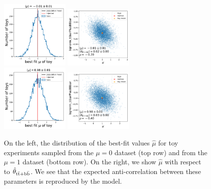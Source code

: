 \begin{figure}
\setlength{\floatsep}{1pt}
\begin{centering}
\includegraphics[width=0.30\textwidth]{figures/tth/mu_sig_group_sldl_0_0.pdf}
\includegraphics[width=0.30\textwidth]{figures/tth/mu_bgnorm_ttbarPlusBBbar_sig_group_sldl_0_0.pdf}\\
\includegraphics[width=0.30\textwidth]{figures/tth/mu_sig_group_sldl_1_0.pdf}
\includegraphics[width=0.30\textwidth]{figures/tth/mu_bgnorm_ttbarPlusBBbar_sig_group_sldl_1_0.pdf}\\
\caption[Fit model validation on toy experiments]{On the left, the distribution of the best-fit values $\hat{\mu}$ for toy experiments sampled from the $\mu=0$ dataset (top row) and from the $\mu=1$ dataset (bottom row). On the right, we show $\hat{\mu}$ with respect to $\hat{\theta}_{\mathrm{t} \bar{\mathrm{t}} + \mathrm{b}\bar{\mathrm{b}}}$. We see that the expected anti-correlation between these parameters is reproduced by the model.}
\label{fig:tth_toy_studies}
\end{centering}
\end{figure}

